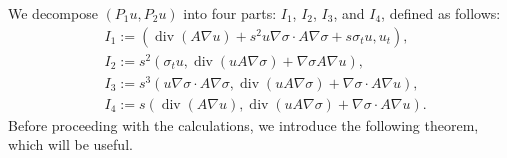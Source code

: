 \documentclass[9pt,reqno]{amsart}
\theoremstyle{plain}
\numberwithin{equation}{section}
\numberwithin{theorem}{section}
\DeclareMathOperator*{\Div}{\mathrm{div}}
\begin{document}
	We decompose $\left(P_1 u, P_2 u\right)$ into four parts: $I_1$, $I_2$, $I_3$, and $I_4$, defined as follows:
	\begin{equation*}
		\begin{split}
			& I_1:=\left(\Div(A \nabla u)+s^2 u \nabla \sigma \cdot A \nabla \sigma+s \sigma_t u, u_t\right), \\
			& I_2:=s^2\left(\sigma_t u, \Div(u A \nabla \sigma)+\nabla \sigma A \nabla u\right), \\
			&I_3:=s^3\left( u \nabla \sigma \cdot A \nabla \sigma, \Div(u A \nabla \sigma)+\nabla \sigma \cdot A \nabla u\right),\\
			& I_4:=s(\Div(A \nabla u), \Div(u A \nabla \sigma)+\nabla \sigma \cdot A \nabla u).
		\end{split}
	\end{equation*}
	Before proceeding with the calculations, we introduce the following theorem, which will be useful.
\end{document}

